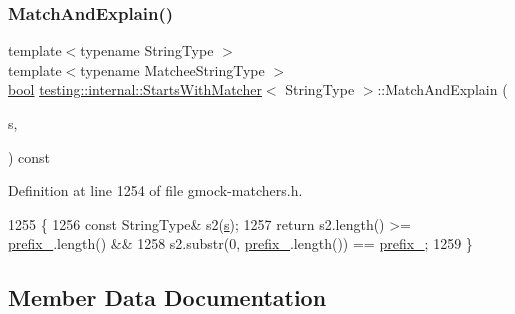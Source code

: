 \subsubsection{\texorpdfstring{Match\+And\+Explain()}{MatchAndExplain()}\hspace{0.1cm}{\footnotesize\ttfamily [2/2]}}
{\footnotesize\ttfamily template$<$typename String\+Type $>$ \\
template$<$typename Matchee\+String\+Type $>$ \\
\hyperlink{classbool}{bool} \hyperlink{classtesting_1_1internal_1_1StartsWithMatcher}{testing\+::internal\+::\+Starts\+With\+Matcher}$<$ String\+Type $>$\+::Match\+And\+Explain (\begin{DoxyParamCaption}\item[{const Matchee\+String\+Type \&}]{s,  }\item[{\hyperlink{classtesting_1_1MatchResultListener}{Match\+Result\+Listener} $\ast$}]{ }\end{DoxyParamCaption}) const\hspace{0.3cm}{\ttfamily [inline]}}



Definition at line 1254 of file gmock-\/matchers.\+h.


\begin{DoxyCode}
1255                                                      \{
1256     \textcolor{keyword}{const} StringType& s2(\hyperlink{namespaceservice__node__3_aa976421a49e0b54f23833423400849ae}{s});
1257     \textcolor{keywordflow}{return} s2.length() >= \hyperlink{classtesting_1_1internal_1_1StartsWithMatcher_a9122de4c38f40c95f822fb8d290942f9}{prefix\_}.length() &&
1258         s2.substr(0, \hyperlink{classtesting_1_1internal_1_1StartsWithMatcher_a9122de4c38f40c95f822fb8d290942f9}{prefix\_}.length()) == \hyperlink{classtesting_1_1internal_1_1StartsWithMatcher_a9122de4c38f40c95f822fb8d290942f9}{prefix\_};
1259   \}
\end{DoxyCode}


\subsection{Member Data Documentation}
\mbox{\label{classtesting_1_1internal_1_1StartsWithMatcher_a9122de4c38f40c95f822fb8d290942f9}} 
